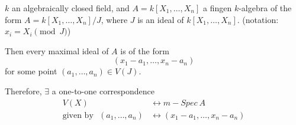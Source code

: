 \documentclass{article}
\theoremstyle{definition}
\newenvironment{prop}[1]
{\renewcommand\theinnerprop{#1}\innerprop}
{\endinnerprop}
\begin{document}
\begin{prop}{5.3} \label{5.3}
  $k$ an algebraically closed field, and $A=k[X_1, \ldots, X_n]$ a fingen $k$-algebra of the form $A=k[X_1, \ldots, X_n]/J$, where $J$ is an ideal of $k[X_1, \ldots, X_n]$.
  (notation: $x_i = X_i \pmod J$)

  Then every maximal ideal of $A$ is of the form
  $$(x_1 -a_1, \ldots, x_n - a_n)$$
  for some point $(a_1, \ldots, a_n) \in V(J)$.

  Therefore, $\exists$ a one-to-one correspondence
  \begin{align*}
    V(X) &\longleftrightarrow m-Spec~ A\\
    \text{given by}~~~(a_1, \ldots, a_n) &\longleftrightarrow (x_1 -a_1, \ldots, x_n - a_n)
  \end{align*}
\end{prop}
\end{document}
